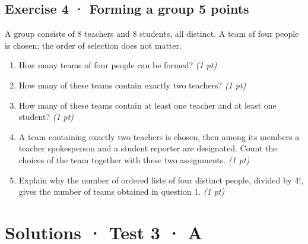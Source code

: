 \subsection*{Exercise 4 · Forming a group \hfill 5 points}A group consists of $8$ teachers and $8$ students, all distinct. A team of four people is chosen; the order of selection does not matter.

\begin{enumerate}

\item How many teams of four people can be formed? \hfill\textit{(1 pt)}

\item How many of these teams contain exactly two teachers? \hfill\textit{(1 pt)}

\item How many of these teams contain at least one teacher and at least one student? \hfill\textit{(1 pt)}

\item A team containing exactly two teachers is chosen, then among its members a teacher spokesperson and a student reporter are designated. Count the choices of the team together with these two assignments. \hfill\textit{(1 pt)}

\item Explain why the number of ordered lists of four distinct people, divided by $4!$, gives the number of teams obtained in question 1. \hfill\textit{(1 pt)}

\end{enumerate}

\ifmxteacher\mxnewpage

\section*{Solutions · Test 3 · A}\label{cor:4-3}

